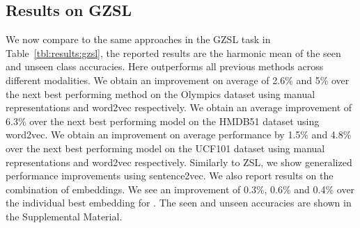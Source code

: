 \documentclass[runningheads]{llncs}
\begin{document}
\subsection{Results on GZSL}
\label{GZSL}

We now compare to the same approaches in the GZSL task in Table~\ref{tbl:results:gzsl},  the reported results are the harmonic mean of the seen and unseen class accuracies. Here \MethodName outperforms all previous methods across different modalities. We obtain an improvement on average of 2.6\% and 5\% over the next best performing method on the Olympics dataset using manual representations and word2vec respectively. We obtain an average improvement of 6.3\% over the next best performing model on the HMDB51 dataset using word2vec. We obtain an improvement on average performance by 1.5\% and 4.8\% over the next best performing model on the UCF101 dataset using manual representations and word2vec respectively. Similarly to ZSL, we show generalized performance improvements using sentence2vec. We also report results on the combination of embeddings. We see an improvement of 0.3\%, 0.6\% and 0.4\% over the individual best  embedding for \MethodName. The seen and unseen accuracies are shown in the Supplemental Material.
\end{document}

